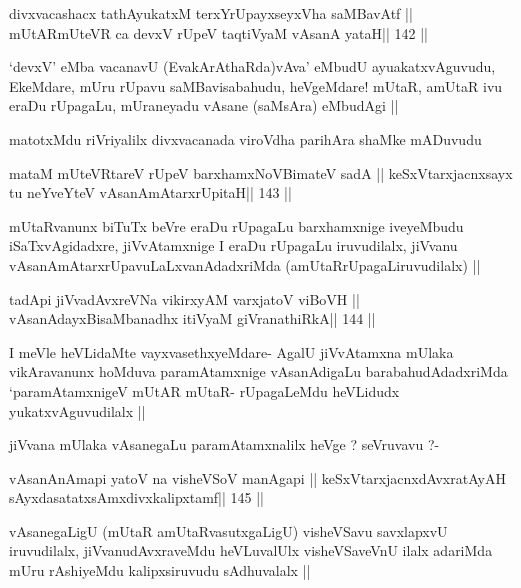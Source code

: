 \begin{shl}
divxvacashacx tathA\s yukatxM terxYrUpayxseyxVha saMBavAtf ||
mUtARmUteVR ca devxV rUpeV taqtiVyaM vAsanA yataH\hfill || 142 ||
\end{shl}

\begin{artha}
`devxV' eMba vacanavU (EvakArAthaRda)vAva' eMbudU ayuakatxvAguvudu,
  EkeMdare, mUru rUpavu saMBavisabahudu, heVgeMdare! mUtaR, amUtaR ivu
  eraDu rUpagaLu, mUraneyadu vAsane (saMsAra) eMbudAgi ||

matotxMdu riVriyalilx divxvacanada viroVdha parihAra shaMke mADuvudu
\end{artha}

\begin{shl}
mataM mUteVRtareV rUpeV barxhamxNoV\s BimateV sadA ||
keSxVtarxjacnxsayx tu neYveYteV vAsanAmAtarxrUpitaH\hfill || 143 ||
\end{shl}

\begin{artha}
mUtaRvanunx biTuTx beVre eraDu rUpagaLu barxhamxnige iveyeMbudu
iSaTxvAgidadxre, jiVvAtamxnige I eraDu rUpagaLu iruvudilalx, jiVvanu
vAsanAmAtarxrUpavuLaLxvanAdadxriMda (amUtaRrUpagaLiruvudilalx) ||
\end{artha}

\begin{shl}
tadA\s pi jiVvadAvxreVNa vikirxyAM varxjatoV viBoVH ||
vAsanAdayxBisaMbanadhx itiVyaM giVranathiRkA\hfill || 144 ||
\end{shl}

\begin{artha}
I meVle heVLidaMte vayxvasethxyeMdare- AgalU jiVvAtamxna mUlaka
vikAravanunx hoMduva paramAtamxnige vAsanAdigaLu barabahudAdadxriMda
`paramAtamxnigeV mUtAR mUtaR- rUpagaLeMdu heVLidudx yukatxvAguvudilalx
||

jiVvana mUlaka vAsanegaLu paramAtamxnalilx heVge ? seVruvavu ?-
\end{artha}

\begin{shl}
vAsanAnAmapi yatoV na visheVSoV manAgapi ||
keSxVtarxjacnxdAvxratAyAH sAyxdasatatxsAmxdivxkalipxtamf\hfill || 145 ||
\end{shl}

\begin{artha}
vAsanegaLigU (mUtaR amUtaRvasutxgaLigU) visheVSavu savxlapxvU
iruvudilalx, jiVvanudAvxraveMdu heVLuvalUlx visheVSaveVnU ilalx
adariMda mUru rAshiyeMdu kalipxsiruvudu sAdhuvalalx ||
\end{artha}

